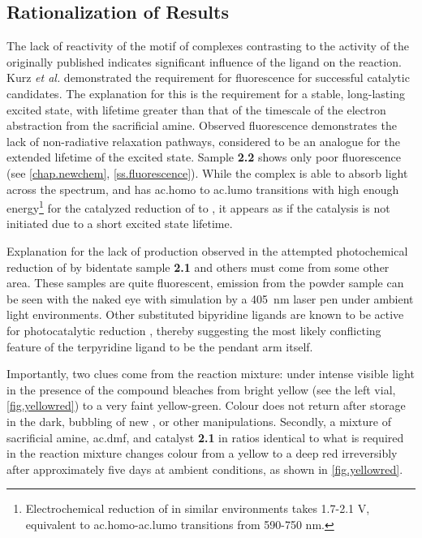 \subsection{Rationalization of Results}\label{ss.rationalization}

The lack of reactivity of the  motif of complexes contrasting to the activity of the originally published  indicates significant influence of the ligand on the reaction. Kurz \textit{et al.} demonstrated the requirement for fluorescence for successful catalytic candidates\autocite{kurz2006}. The explanation for this is the requirement for a stable, long-lasting excited state, with lifetime greater than that of the timescale of the electron abstraction from the sacrificial amine. Observed fluorescence demonstrates the lack of non-radiative relaxation pathways, considered to be an analogue for the extended lifetime of the excited state. Sample \textbf{2.2} shows only poor fluorescence (see \autoref{chap.newchem}, \autoref{ss.fluorescence}). While the complex is able to absorb light across the spectrum, and has \gls{ac.homo} to \gls{ac.lumo} transitions with high enough energy\footnote{Electrochemical reduction of  in similar environments takes 1.7-2.1 V, equivalent to \gls{ac.homo}-\gls{ac.lumo} transitions from 590-750 nm\autocite{grills2014}.} for the catalyzed reduction of  to , it appears as if the catalysis is not initiated due to a short excited state lifetime.

Explanation for the lack of  production observed in the attempted photochemical reduction of  by bidentate sample \textbf{2.1} and others must come from some other area. These samples are quite fluorescent, emission from the powder sample can be seen with the naked eye with simulation by a 405~nm laser pen under ambient light environments. Other substituted bipyridine ligands are known to be active for photocatalytic reduction \autocite{hawecker1986, kurz2006}, thereby suggesting the most likely conflicting feature of the terpyridine ligand to be the pendant arm itself.

Importantly, two clues come from the reaction mixture: under intense visible light in the presence of  the compound bleaches from bright yellow (see the left vial, \autoref{fig.yellowred}) to a very faint yellow-green. Colour does not return after storage in the dark, bubbling of new , or other manipulations. Secondly, a mixture of sacrificial amine, \gls{ac.dmf}, and catalyst \textbf{2.1} in ratios identical to what is required in the reaction mixture changes colour from a yellow to a deep red irreversibly after approximately five days at ambient conditions, as shown in \autoref{fig.yellowred}. 

